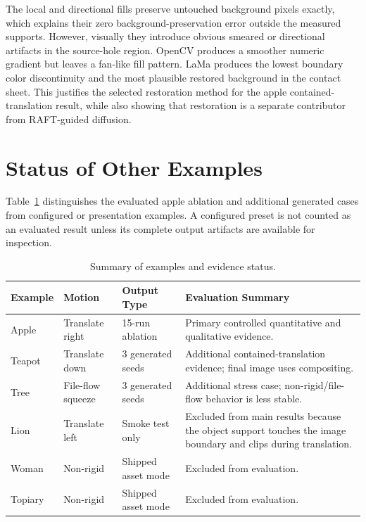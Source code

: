 The local and directional fills preserve untouched background pixels exactly, which explains their zero background-preservation error outside the measured supports. However, visually they introduce obvious smeared or directional artifacts in the source-hole region. OpenCV produces a smoother numeric gradient but leaves a fan-like fill pattern. LaMa produces the lowest boundary color discontinuity and the most plausible restored background in the contact sheet. This justifies the selected restoration method for the apple contained-translation result, while also showing that restoration is a separate contributor from RAFT-guided diffusion.

\section{Status of Other Examples}

Table~\ref{tab:main-generated-results} distinguishes the evaluated apple ablation and additional generated cases from configured or presentation examples. A configured preset is not counted as an evaluated result unless its complete output artifacts are available for inspection.

\begin{table}[t]
  \caption{Summary of examples and evidence status.}
  \centering
  \small
  \begin{tabular}{p{0.8in}|p{1.0in}|p{1.3in}|p{1.85in}}
    \hline
    Example & Motion & Output Type & Evaluation Summary \\ \hline \hline
    Apple & Translate right & 15-run ablation & Primary controlled quantitative and qualitative evidence. \\ \hline
    Teapot & Translate down & 3 generated seeds & Additional contained-translation evidence; final image uses compositing. \\ \hline
    Tree & File-flow squeeze & 3 generated seeds & Additional stress case; non-rigid/file-flow behavior is less stable. \\ \hline
    Lion & Translate left & Smoke test only & Excluded from main results because the object support touches the image boundary and clips during translation. \\ \hline
    Woman & Non-rigid & Shipped asset mode & Excluded from evaluation. \\ \hline
    Topiary & Non-rigid & Shipped asset mode & Excluded from evaluation. \\ \hline
  \end{tabular}
  \label{tab:main-generated-results}
\end{table}

